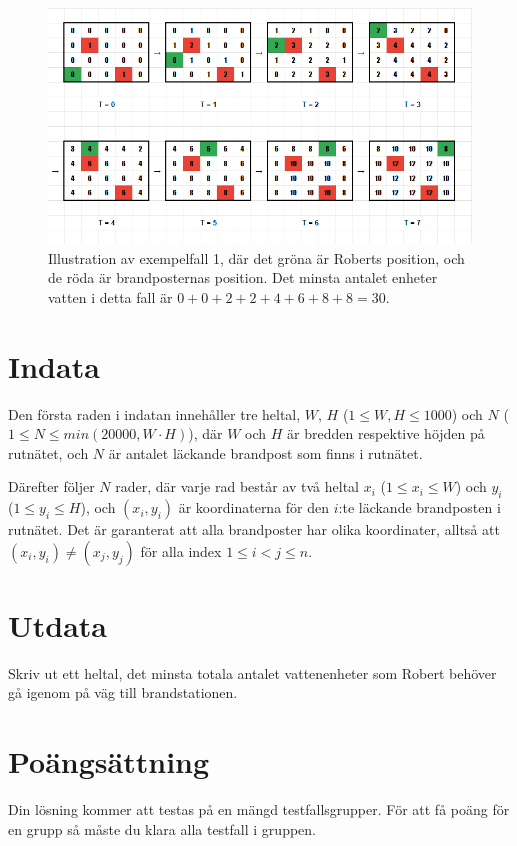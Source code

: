 \begin{centering}
  \begin{figure}[h]
    \centering
  \includegraphics[width=1\textwidth]{brandpostSample1.png}
    \caption{Illustration av exempelfall 1, där det gröna är Roberts position, och de röda är brandposternas position. Det minsta antalet enheter vatten i detta fall är $0+0+2+2+4+6+8+8=30$.}
    \label{fig:brandpost}
  \end{figure}
\end{centering}

\section*{Indata}
Den första raden i indatan innehåller tre heltal, $W$, $H$ ($1 \le W,H \le 1000$) och $N$ ($1 \le N \le min(20000,W \cdot H)$), 
där $W$ och $H$ är bredden respektive höjden på rutnätet, och $N$ är antalet läckande brandpost som finns i rutnätet.

Därefter följer $N$ rader, där varje rad består av två heltal $x_i$ ($1 \le x_i \le W$) och $y_i$ ($1 \le y_i \le H$), 
och $(x_i,y_i)$ är koordinaterna för den $i$:te läckande brandposten i rutnätet. 
Det är garanterat att alla brandposter har olika koordinater, alltså att $(x_i,y_i) \neq (x_j,y_j)$ för alla index $1 \le i < j \le n$.

\section*{Utdata}
Skriv ut ett heltal, det minsta totala antalet vattenenheter som Robert behöver gå igenom på väg till brandstationen.

\section*{Poängsättning}
Din lösning kommer att testas på en mängd testfallsgrupper.
För att få poäng för en grupp så måste du klara alla testfall i gruppen.

